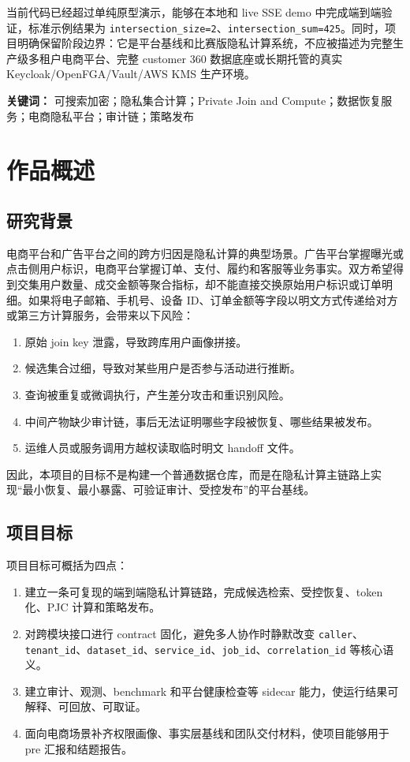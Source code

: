 \documentclass[UTF8,a4paper,12pt,oneside]{ctexrep}
\begin{document}
当前代码已经超过单纯原型演示，能够在本地和 live SSE demo 中完成端到端验证，标准示例结果为 \texttt{intersection\_size=2}、\texttt{intersection\_sum=425}。同时，项目明确保留阶段边界：它是平台基线和比赛版隐私计算系统，不应被描述为完整生产级多租户电商平台、完整 customer 360 数据底座或长期托管的真实 Keycloak/OpenFGA/Vault/AWS KMS 生产环境。

\noindent\textbf{关键词：} 可搜索加密；隐私集合计算；Private Join and Compute；数据恢复服务；电商隐私平台；审计链；策略发布

\tableofcontents
\clearpage
{}

\chapter{作品概述}

\section{研究背景}

电商平台和广告平台之间的跨方归因是隐私计算的典型场景。广告平台掌握曝光或点击侧用户标识，电商平台掌握订单、支付、履约和客服等业务事实。双方希望得到交集用户数量、成交金额等聚合指标，却不能直接交换原始用户标识或订单明细。如果将电子邮箱、手机号、设备 ID、订单金额等字段以明文方式传递给对方或第三方计算服务，会带来以下风险：

\begin{enumerate}
  \item 原始 join key 泄露，导致跨库用户画像拼接。
  \item 候选集合过细，导致对某些用户是否参与活动进行推断。
  \item 查询被重复或微调执行，产生差分攻击和重识别风险。
  \item 中间产物缺少审计链，事后无法证明哪些字段被恢复、哪些结果被发布。
  \item 运维人员或服务调用方越权读取临时明文 handoff 文件。
\end{enumerate}

因此，本项目的目标不是构建一个普通数据仓库，而是在隐私计算主链路上实现“最小恢复、最小暴露、可验证审计、受控发布”的平台基线。

\section{项目目标}

项目目标可概括为四点：

\begin{enumerate}
  \item 建立一条可复现的端到端隐私计算链路，完成候选检索、受控恢复、token 化、PJC 计算和策略发布。
  \item 对跨模块接口进行 contract 固化，避免多人协作时静默改变 \texttt{caller}、\texttt{tenant\_id}、\texttt{dataset\_id}、\texttt{service\_id}、\texttt{job\_id}、\texttt{correlation\_id} 等核心语义。
  \item 建立审计、观测、benchmark 和平台健康检查等 sidecar 能力，使运行结果可解释、可回放、可取证。
  \item 面向电商场景补齐权限画像、事实层基线和团队交付材料，使项目能够用于 pre 汇报和结题报告。
\end{enumerate}
\end{document}
